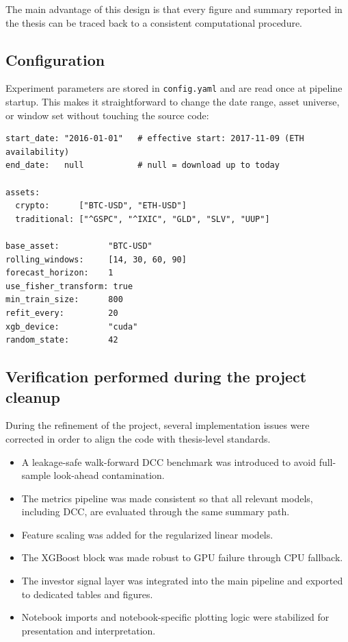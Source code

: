 The main advantage of this design is that every figure and summary reported in the thesis can be traced back to a consistent computational procedure.

\subsection{Configuration}

Experiment parameters are stored in \texttt{config.yaml} and are read once at pipeline startup. This makes it straightforward to change the date range, asset universe, or window set without touching the source code:

\begin{lstlisting}[language={}, caption={Excerpt from \texttt{config.yaml} showing key experiment parameters.}, label=lst:config]
start_date: "2016-01-01"   # effective start: 2017-11-09 (ETH availability)
end_date:   null           # null = download up to today

assets:
  crypto:      ["BTC-USD", "ETH-USD"]
  traditional: ["^GSPC", "^IXIC", "GLD", "SLV", "UUP"]

base_asset:          "BTC-USD"
rolling_windows:     [14, 30, 60, 90]
forecast_horizon:    1
use_fisher_transform: true
min_train_size:      800
refit_every:         20
xgb_device:          "cuda"
random_state:        42
\end{lstlisting}

\subsection{Verification performed during the project cleanup}

During the refinement of the project, several implementation issues were corrected in order to align the code with thesis-level standards.

\begin{itemize}
    \item A leakage-safe walk-forward DCC benchmark was introduced to avoid full-sample look-ahead contamination.
    \item The metrics pipeline was made consistent so that all relevant models, including DCC, are evaluated through the same summary path.
    \item Feature scaling was added for the regularized linear models.
    \item The XGBoost block was made robust to GPU failure through CPU fallback.
    \item The investor signal layer was integrated into the main pipeline and exported to dedicated tables and figures.
    \item Notebook imports and notebook-specific plotting logic were stabilized for presentation and interpretation.
\end{itemize}

